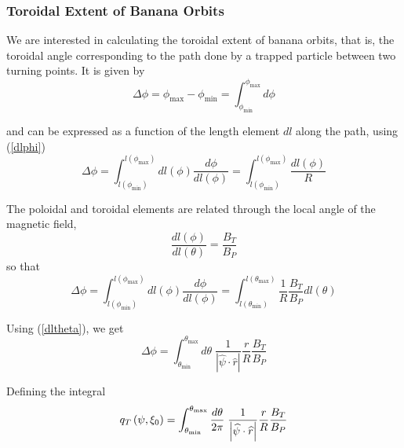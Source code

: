 \subsubsection{Toroidal Extent of Banana Orbits}

We are interested in calculating the toroidal extent of banana orbits, that
is, the toroidal angle corresponding to the path done by a trapped particle
between two turning points. It is given by 
\begin{equation}
\Delta\phi=\phi_{\max}-\phi_{\min}=\int_{\phi_{\min}}^{\phi_{\max}}d\phi
\end{equation}


and can be expressed as a function of the length element $dl$ along the
path, using (\ref{dlphi}) 
\begin{equation}
\Delta\phi=\int_{l\left( \phi_{\min}\right) }^{l\left( \phi_{\max}\right)
}dl\left( \phi\right) \frac{d\phi}{dl\left( \phi\right) }=\int_{l\left(
\phi_{\min}\right) }^{l\left( \phi_{\max}\right) }\frac{dl\left( \phi\right) 
}{R}
\end{equation}

The poloidal and toroidal elements are related through the local angle of
the magnetic field, 
\begin{equation}
\frac{dl\left( \phi\right) }{dl\left( \theta\right) }=\frac{B_{T}}{B_{P}}
\end{equation}
so that 
\begin{equation}
\Delta\phi=\int_{l\left( \phi_{\min}\right) }^{l\left( \phi_{\max}\right)
}dl\left( \phi\right) \frac{d\phi}{dl\left( \phi\right) }=\int_{l\left(
\theta_{\min}\right) }^{l\left( \theta_{\max}\right) }\frac{1}{R}\frac{B_{T}%
}{B_{P}}dl\left( \theta\right)
\end{equation}

Using (\ref{dltheta}), we get 
\begin{equation}
\Delta\phi=\int_{\theta_{\min}}^{\theta_{\max}}d\theta\;\frac{1}{\left| 
\widehat{\psi}\cdot\widehat{r}\right| }\frac{r}{R}\frac{B_{T}}{B_{P}}
\end{equation}

Defining the integral 
\begin{equation}
q_{T}\left( \psi,\xi_{0}\right) =\int_{\theta_{\min}}^{\theta_{\max}}\frac{%
d\theta}{2\pi}\;\frac{1}{\left| \widehat{\psi}\cdot\widehat{r} \right| }%
\frac{r}{R}\frac{B_{T}}{B_{P}}  \label{qtdef}
\end{equation}

